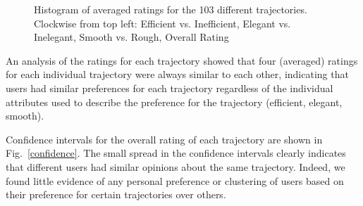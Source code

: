 \documentclass[letterpaper, 10 pt, conference]{ieeeconf}  %
\begin{document}
\begin{figure}[t]
  \caption{Histogram of averaged ratings for the 103 different trajectories. Clockwise from top left: Efficient vs. Inefficient, Elegant vs. Inelegant, Smooth vs. Rough, Overall Rating}
\label{fig:survey_raw}
\end{figure}


An analysis of the ratings for each trajectory showed that four (averaged) ratings for each individual trajectory were always similar to each other, indicating that users had similar preferences for each trajectory regardless of the individual attributes used to describe the preference for the trajectory (efficient, elegant, smooth). 

Confidence intervals for the overall rating of each trajectory are shown in Fig.~\ref{confidence}. The small spread in the confidence intervals clearly indicates that different users had similar opinions about the same trajectory. Indeed, we found little evidence of any personal preference or clustering of users based on their preference for certain trajectories over others. 


\addtolength{\textheight}{-12cm}   %
\end{document}
